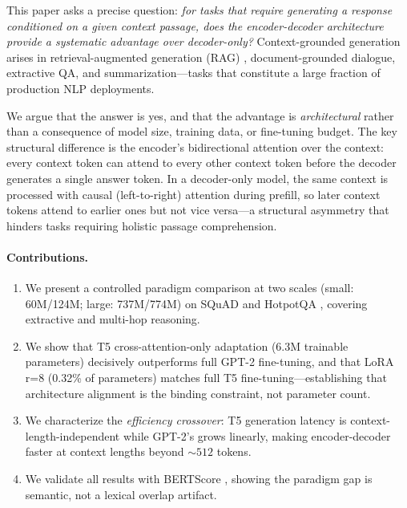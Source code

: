 \documentclass[11pt]{article}
\newcommand{\squad}{SQuAD\xspace}
\newcommand{\hotpotqa}{HotpotQA\xspace}
\begin{document}
This paper asks a precise question: \emph{for tasks that require generating a
response conditioned on a given context passage, does the encoder-decoder
architecture provide a systematic advantage over decoder-only?}
Context-grounded generation arises in retrieval-augmented generation (RAG)
\citep{lewis2020retrieval}, document-grounded dialogue, extractive QA, and
summarization---tasks that constitute a large fraction of production NLP deployments.

We argue that the answer is yes, and that the advantage is \emph{architectural}
rather than a consequence of model size, training data, or fine-tuning budget.
The key structural difference is the encoder's bidirectional attention over the
context: every context token can attend to every other context token before
the decoder generates a single answer token.
In a decoder-only model, the same context is processed with causal (left-to-right)
attention during prefill, so later context tokens attend to earlier ones but not
vice versa---a structural asymmetry that hinders tasks requiring holistic passage
comprehension.

\paragraph{Contributions.}
\begin{enumerate}
  \item We present a controlled paradigm comparison at two scales (small: 60M/124M;
        large: 737M/774M) on \squad \citep{rajpurkar2016squad} and \hotpotqa
        \citep{yang2018hotpotqa}, covering extractive and multi-hop reasoning.
  \item We show that T5 cross-attention-only adaptation (6.3M trainable parameters)
        decisively outperforms full GPT-2 fine-tuning, and that LoRA r=8
        (0.32\% of parameters) matches full T5 fine-tuning---establishing that
        architecture alignment is the binding constraint, not parameter count.
  \item We characterize the \emph{efficiency crossover}: T5 generation latency is
        context-length-independent while GPT-2's grows linearly, making
        encoder-decoder faster at context lengths beyond ${\sim}512$ tokens.
  \item We validate all results with BERTScore \citep{zhang2020bertscore},
        showing the paradigm gap is semantic, not a lexical overlap artifact.
\end{enumerate}

\end{document}
